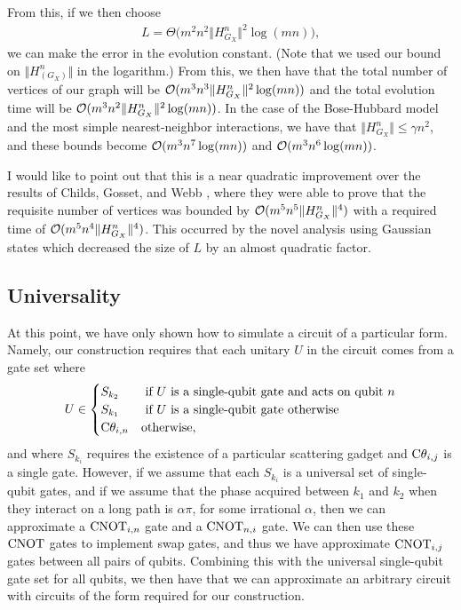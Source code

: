 \documentclass[../thesis-main/thesis-main]{subfiles}
\begin{document}
From this, if we then choose 
\begin{align}
  L = \Theta\Big( m^2 n^2 \Vert H_{G_X}^n \Vert^2 \log(m n)\Big),
\end{align}
we can make the error in the evolution constant. (Note that we used our bound on $\Vert H_(G_X)^n\Vert$ in the logarithm.)  From this, we then have that the total number of vertices of our graph will be $\mathcal{O}(m^3 n^3 \Vert H_{G_X}^n \Vert^2 \log(m n))$ and the total evolution time will be $\mathcal{O}(m^3 n^2 \Vert H_{G_X}^n \Vert^2 \log(m n))$.  In the case of the Bose-Hubbard model and the most simple nearest-neighbor interactions, we have that $\Vert H_{G_X}^n\Vert \leq \gamma n^2$, and these bounds become $\mathcal{O}( m^3 n^7 \log(mn))$ and $\mathcal{O}(m^3 n^6 \log(mn))$.

I would like to point out that this is a near quadratic improvement over the results of Childs, Gosset, and Webb \cite{MPQW}, where they were able to prove that the requisite number of vertices was bounded by $\mathcal{O}(m^5 n^5 \Vert H_{G_X}^n\Vert ^4)$ with a required time of $\mathcal{O}(m^5n^4\Vert H_{G_X}^n\Vert ^4)$.  This occurred by the novel analysis using Gaussian states which decreased the size of $L$ by an almost quadratic factor.

\subsection{Universality}

At this point, we have only shown how to simulate a circuit of a particular form.  Namely, our construction requires that each unitary $U$ in the circuit comes from a gate set where 
\begin{align}
  U \in \begin{cases}
    S_{k_2} & \text{ if $U$ is a single-qubit gate and acts on qubit $n$}\\
    S_{k_1} & \text{ if $U$ is a single-qubit gate otherwise}\\
    \mathrm{C}\theta_{i,n} & \text{otherwise},
  \end{cases}
\end{align}
and where $S_{k_i}$ requires the existence of a particular scattering gadget and $\mathrm{C}\theta_{i,j}$ is a single gate.  However, if we assume that each $S_{k_i}$ is a universal set of single-qubit gates, and if we assume that the phase acquired between $k_1$ and $k_2$ when they interact on a long path is $\alpha \pi$, for some irrational $\alpha$, then we can approximate a $\mathrm{CNOT}_{i,n}$ gate and a $\mathrm{CNOT}_{n,i}$ gate.  We can then use these $\mathrm{CNOT}$ gates to implement swap gates, and thus we have approximate $\mathrm{CNOT}_{i,j}$ gates between all pairs of qubits.  Combining this with the universal single-qubit gate set for all qubits, we then have that we can approximate an arbitrary circuit with circuits of the form required for our construction.
\end{document}
